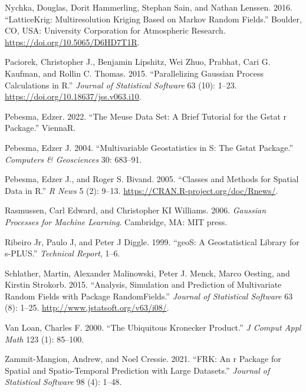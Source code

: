 \begin{CSLReferences}{1}{0}
\leavevmode{}%
Nychka, Douglas, Dorit Hammerling, Stephan Sain, and Nathan Lenssen. 2016. {``LatticeKrig: Multiresolution Kriging Based on Markov Random Fields.''} Boulder, CO, USA: University Corporation for Atmospheric Research. \url{https://doi.org/10.5065/D6HD7T1R}.

\leavevmode{}%
Paciorek, Christopher J., Benjamin Lipshitz, Wei Zhuo, Prabhat, Cari G. Kaufman, and Rollin C. Thomas. 2015. {``Parallelizing Gaussian Process Calculations in {R}.''} \emph{Journal of Statistical Software} 63 (10): 1--23. \url{https://doi.org/10.18637/jss.v063.i10}.

\leavevmode{}%
Pebesma, Edzer. 2022. {``The Meuse Data Set: A Brief Tutorial for the Gstat r Package.''} ViennaR.

\leavevmode{}%
Pebesma, Edzer J. 2004. {``Multivariable Geostatistics in {S}: The Gstat Package.''} \emph{Computers \& Geosciences} 30: 683--91.

\leavevmode{}%
Pebesma, Edzer J., and Roger S. Bivand. 2005. {``Classes and Methods for Spatial Data in {R}.''} \emph{R News} 5 (2): 9--13. \url{https://CRAN.R-project.org/doc/Rnews/}.

\leavevmode{}%
Rasmussen, Carl Edward, and Christopher KI Williams. 2006. \emph{Gaussian Processes for Machine Learning}. Cambridge, MA: MIT press.

\leavevmode{}%
Ribeiro Jr, Paulo J, and Peter J Diggle. 1999. {``geoS: A Geostatistical Library for s-PLUS.''} \emph{Technical Report}, 1--6.

\leavevmode{}%
Schlather, Martin, Alexander Malinowski, Peter J. Menck, Marco Oesting, and Kirstin Strokorb. 2015. {``Analysis, Simulation and Prediction of Multivariate Random Fields with Package {RandomFields}.''} \emph{Journal of Statistical Software} 63 (8): 1--25. \url{http://www.jstatsoft.org/v63/i08/}.

\leavevmode{}%
Van Loan, Charles F. 2000. {``The Ubiquitous {K}ronecker Product.''} \emph{J Comput Appl Math} 123 (1): 85--100.

\leavevmode{}%
Zammit-Mangion, Andrew, and Noel Cressie. 2021. {``FRK: An r Package for Spatial and Spatio-Temporal Prediction with Large Datasets.''} \emph{Journal of Statistical Software} 98 (4): 1--48.

\end{CSLReferences}

